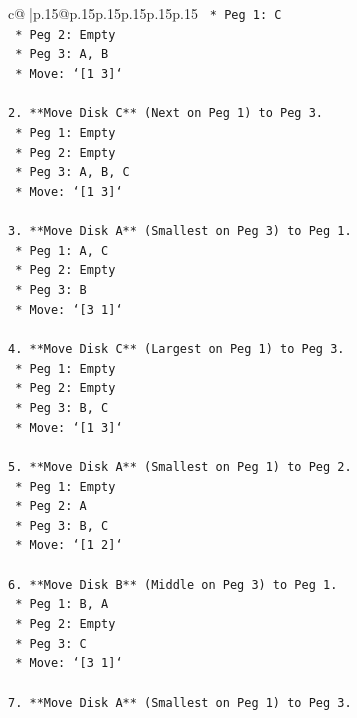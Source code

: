\documentclass{article}
\begin{document}
{\begin{supertabular}{c@{$\;$}|p{.15\linewidth}@{}p{.15\linewidth}p{.15\linewidth}p{.15\linewidth}p{.15\linewidth}p{.15\linewidth}}
{{{\texttt{    *   Peg 1: C} \\
\texttt{    *   Peg 2: Empty} \\
\texttt{    *   Peg 3: A, B} \\
\texttt{    *   Move: `{[}1 3{]}`} \\
\\ 
\texttt{2.  **Move Disk C** (Next on Peg 1) to Peg 3.} \\
\texttt{    *   Peg 1: Empty} \\
\texttt{    *   Peg 2: Empty} \\
\texttt{    *   Peg 3: A, B, C} \\
\texttt{    *   Move: `{[}1 3{]}`} \\
\\ 
\texttt{3.  **Move Disk A** (Smallest on Peg 3) to Peg 1.} \\
\texttt{    *   Peg 1: A, C} \\
\texttt{    *   Peg 2: Empty} \\
\texttt{    *   Peg 3: B} \\
\texttt{    *   Move: `{[}3 1{]}`} \\
\\ 
\texttt{4.  **Move Disk C** (Largest on Peg 1) to Peg 3.} \\
\texttt{    *   Peg 1: Empty} \\
\texttt{    *   Peg 2: Empty} \\
\texttt{    *   Peg 3: B, C} \\
\texttt{    *   Move: `{[}1 3{]}`} \\
\\ 
\texttt{5.  **Move Disk A** (Smallest on Peg 1) to Peg 2.} \\
\texttt{    *   Peg 1: Empty} \\
\texttt{    *   Peg 2: A} \\
\texttt{    *   Peg 3: B, C} \\
\texttt{    *   Move: `{[}1 2{]}`} \\
\\ 
\texttt{6.  **Move Disk B** (Middle on Peg 3) to Peg 1.} \\
\texttt{    *   Peg 1: B, A} \\
\texttt{    *   Peg 2: Empty} \\
\texttt{    *   Peg 3: C} \\
\texttt{    *   Move: `{[}3 1{]}`} \\
\\ 
\texttt{7.  **Move Disk A** (Smallest on Peg 1) to Peg 3.} \\
}}}
\end{supertabular}}
\end{document}
